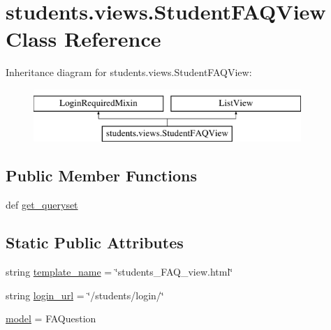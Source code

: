 \hypertarget{classstudents_1_1views_1_1_student_f_a_q_view}{\section{students.\-views.\-Student\-F\-A\-Q\-View Class Reference}
\label{classstudents_1_1views_1_1_student_f_a_q_view}
}
Inheritance diagram for students.\-views.\-Student\-F\-A\-Q\-View\-:\begin{figure}[H]
\begin{center}
\leavevmode
\includegraphics[height=2.000000cm]{classstudents_1_1views_1_1_student_f_a_q_view}
\end{center}
\end{figure}
\subsection*{Public Member Functions}
\begin{DoxyCompactItemize}
\item 
def \hyperlink{classstudents_1_1views_1_1_student_f_a_q_view_ab7a8f396a3327b1aec9bbaf3e28efb9e}{get\-\_\-queryset}
\end{DoxyCompactItemize}
\subsection*{Static Public Attributes}
\begin{DoxyCompactItemize}
\item 
string \hyperlink{classstudents_1_1views_1_1_student_f_a_q_view_a15ab67fe5f4e7cdfcdca7459dbc3c8df}{template\-\_\-name} = \char`\"{}students\-\_\-\-F\-A\-Q\-\_\-view.\-html\char`\"{}
\item 
string \hyperlink{classstudents_1_1views_1_1_student_f_a_q_view_a187c58fd089481cf81e7bbb14e0c65bd}{login\-\_\-url} = \char`\"{}/students/login/\char`\"{}
\item 
\hyperlink{classstudents_1_1views_1_1_student_f_a_q_view_a4bf4e4cb8a13b7d970373e37fe67ce74}{model} = F\-A\-Question
\end{DoxyCompactItemize}


